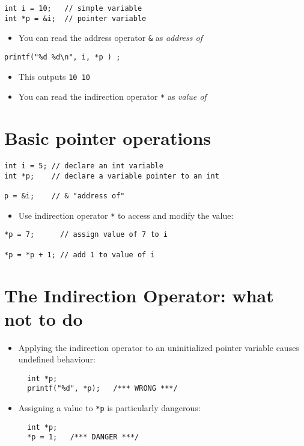 \documentclass{article}
\begin{document}
\begin{verbatim}
int i = 10;   // simple variable
int *p = &i;  // pointer variable
\end{verbatim}

\begin{itemize}
\item You can read the address operator \verb!&! as \emph{address of}
\end{itemize}
 
\begin{verbatim}
printf("%d %d\n", i, *p ) ;
\end{verbatim}

\begin{itemize}
\item This outputs \verb!10 10!

\item You can read the indirection operator \verb!*! as \emph{value of}
\end{itemize}



\section{Basic pointer operations}
\begin{verbatim}
int i = 5; // declare an int variable
int *p;    // declare a variable pointer to an int

p = &i;    // & "address of"
\end{verbatim}

\begin{itemize}
\item Use indirection operator \verb!*! to access and modify the value:
\end{itemize}
\begin{verbatim}
*p = 7;      // assign value of 7 to i

*p = *p + 1; // add 1 to value of i
\end{verbatim}



\section{The Indirection Operator: what not to do}
\begin{itemize}
\item Applying the indirection operator to an uninitialized pointer variable causes undefined behaviour:
\begin{verbatim}
  int *p;
  printf("%d", *p);   /*** WRONG ***/
\end{verbatim}


\item Assigning a value to \verb!*p! is particularly dangerous:
\begin{verbatim}
  int *p;
  *p = 1;   /*** DANGER ***/
\end{verbatim}

\end{itemize}
\end{document}
